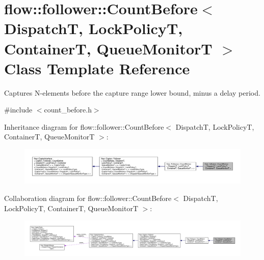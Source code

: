 \hypertarget{classflow_1_1follower_1_1_count_before}{}\section{flow\+:\+:follower\+:\+:Count\+Before$<$ DispatchT, Lock\+PolicyT, ContainerT, Queue\+MonitorT $>$ Class Template Reference}
\label{classflow_1_1follower_1_1_count_before}


Captures N-\/elements before the capture range lower bound, minus a delay period.  




{\ttfamily \#include $<$count\+\_\+before.\+h$>$}



Inheritance diagram for flow\+:\+:follower\+:\+:Count\+Before$<$ DispatchT, Lock\+PolicyT, ContainerT, Queue\+MonitorT $>$\+:
\nopagebreak
\begin{figure}[H]
\begin{center}
\leavevmode
\includegraphics[width=350pt]{classflow_1_1follower_1_1_count_before__inherit__graph}
\end{center}
\end{figure}


Collaboration diagram for flow\+:\+:follower\+:\+:Count\+Before$<$ DispatchT, Lock\+PolicyT, ContainerT, Queue\+MonitorT $>$\+:
\nopagebreak
\begin{figure}[H]
\begin{center}
\leavevmode
\includegraphics[width=350pt]{classflow_1_1follower_1_1_count_before__coll__graph}
\end{center}
\end{figure}
